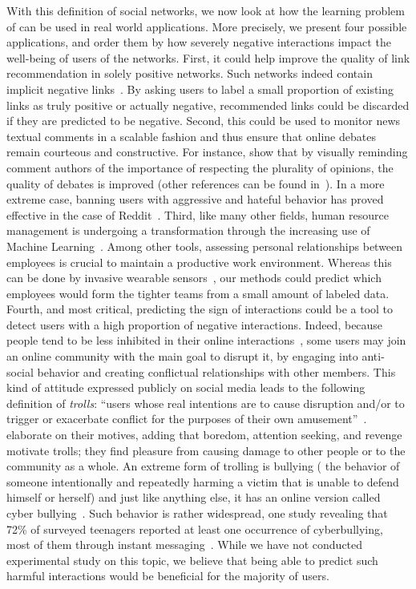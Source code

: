 \bigskip

With this definition of social networks, we now look at how the learning problem of \esp{} can be
used in real world applications. More precisely, we present four possible applications, and order
them by how severely negative interactions impact the well-being of users of the networks.
First, it could help improve the quality of link recommendation in solely positive networks. Such
networks indeed contain implicit negative links~\autocite{Yang2012}. By asking users to label a
small proportion of existing links as truly positive or actually negative, recommended links could
be discarded if they are predicted to be negative.
%
Second, this could be used to monitor news textual comments in a scalable fashion and thus ensure
that online debates remain courteous and constructive. For instance, \textcite{betterDebate14} show
that by visually reminding comment authors of the importance of respecting the plurality of
opinions, the quality of debates is improved (other references can be found
in~\autocite{journalism15}). In a more extreme case, banning users with aggressive and hateful
behavior has proved effective in the case of Reddit~\autocite{RedditBan15}.
%
Third, like many other fields, human resource management is undergoing a transformation through the
increasing use of Machine Learning~\autocite{MLinHR16}. Among other tools, assessing personal
relationships between employees is crucial to maintain a productive work environment. Whereas this
can be done by invasive wearable sensors~\autocite{WearableBehavior09}, our methods could predict
which employees would form the tighter teams from a small amount of labeled data.
%
Fourth, and most critical, predicting the sign of interactions could be a tool to detect users with
a high proportion of negative interactions. Indeed, because people tend to be less inhibited in
their online interactions~\cite{Suler04}, some users may join an online community with the main goal
to disrupt it, by engaging into anti-social behavior and creating conflictual relationships with
other members. This kind of attitude expressed publicly on social media leads to the following
definition of \emph{trolls}: \enquote{users whose real intentions are to cause disruption and/or to
trigger or exacerbate conflict for the purposes of their own amusement}~\autocite{Hardaker10}.
\Textcite{Shachaf10} elaborate on their motives, adding that boredom, attention seeking, and
revenge motivate trolls; they find pleasure from causing damage to other people or to the community
as a whole. An extreme form of trolling is bullying (\ie{} the behavior of someone intentionally and
repeatedly harming a victim that is unable to defend himself or herself) and just like anything
else, it has an online version called cyber bullying~\autocite{cyberbullying13}. Such behavior is
rather widespread, one study revealing that 72\% of  surveyed teenagers reported at least
one occurrence of cyberbullying, most of them through instant messaging~\autocite{Juvonen08}. While
we have not conducted experimental study on this topic, we believe that being able to predict such
harmful interactions would be beneficial for the majority of users.


